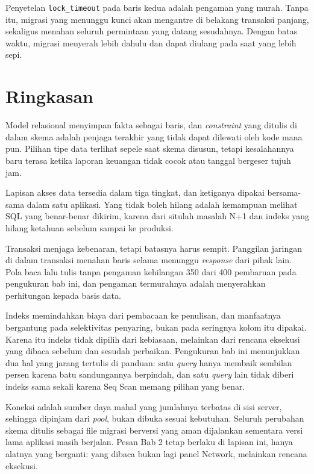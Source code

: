 Penyetelan \texttt{lock\_timeout} pada baris kedua adalah pengaman yang murah.
Tanpa itu, migrasi yang menunggu kunci akan mengantre di belakang transaksi
panjang, sekaligus menahan seluruh permintaan yang datang sesudahnya. Dengan
batas waktu, migrasi menyerah lebih dahulu dan dapat diulang pada saat yang
lebih sepi.

\section{Ringkasan}

Model relasional menyimpan fakta sebagai baris, dan \textit{constraint} yang ditulis di
dalam skema adalah penjaga terakhir yang tidak dapat dilewati oleh kode mana
pun. Pilihan tipe data terlihat sepele saat skema disusun, tetapi kesalahannya
baru terasa ketika laporan keuangan tidak cocok atau tanggal bergeser tujuh
jam.

Lapisan akses data tersedia dalam tiga tingkat, dan ketiganya dipakai
bersama-sama dalam satu aplikasi. Yang tidak boleh hilang adalah kemampuan
melihat SQL yang benar-benar dikirim, karena dari situlah masalah N+1 dan
indeks yang hilang ketahuan sebelum sampai ke produksi.

Transaksi menjaga kebenaran, tetapi batasnya harus sempit. Panggilan jaringan
di dalam transaksi menahan baris selama menunggu \textit{response} dari pihak lain. Pola
baca lalu tulis tanpa pengaman kehilangan 350 dari 400 pembaruan pada
pengukuran bab ini, dan pengaman termurahnya adalah menyerahkan perhitungan
kepada basis data.

Indeks memindahkan biaya dari pembacaan ke penulisan, dan manfaatnya bergantung
pada selektivitas penyaring, bukan pada seringnya kolom itu dipakai. Karena itu
indeks tidak dipilih dari kebiasaan, melainkan dari rencana eksekusi yang
dibaca sebelum dan sesudah perbaikan. Pengukuran bab ini menunjukkan dua hal
yang jarang tertulis di panduan: satu \textit{query} hanya membaik sembilan persen
karena batu sandungannya berpindah, dan satu \textit{query} lain tidak diberi indeks
sama sekali karena Seq Scan memang pilihan yang benar.

Koneksi adalah sumber daya mahal yang jumlahnya terbatas di sisi server,
sehingga dipinjam dari \textit{pool}, bukan dibuka sesuai kebutuhan. Seluruh perubahan
skema ditulis sebagai file migrasi berversi yang aman dijalankan sementara
versi lama aplikasi masih berjalan. Pesan Bab 2 tetap berlaku di lapisan ini,
hanya alatnya yang berganti: yang dibaca bukan lagi panel Network, melainkan
rencana eksekusi.

